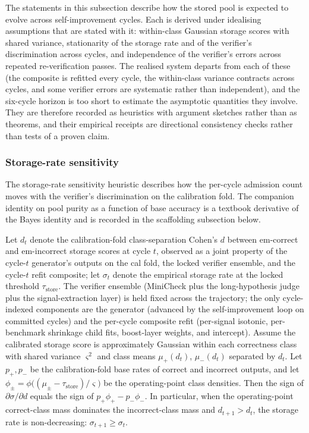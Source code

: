 The statements in this subsection describe how the stored pool is expected to evolve across self-improvement cycles. Each is derived under idealising assumptions that are stated with it: within-class Gaussian storage scores with shared variance, stationarity of the storage rate and of the verifier's discrimination across cycles, and independence of the verifier's errors across repeated re-verification passes. The realised system departs from each of these (the composite is refitted every cycle, the within-class variance contracts across cycles, and some verifier errors are systematic rather than independent), and the six-cycle horizon is too short to estimate the asymptotic quantities they involve. They are therefore recorded as heuristics with argument sketches rather than as theorems, and their empirical receipts are directional consistency checks rather than tests of a proven claim.

\subsubsection{Storage-rate sensitivity}
\label{sec:theorem-monotonicity}

The storage-rate sensitivity heuristic describes how the per-cycle admission count moves with the verifier's discrimination on the calibration fold. The companion identity on pool purity as a function of base accuracy is a textbook derivative of the Bayes identity and is recorded in the scaffolding subsection below.

\begin{heuristic}
\label{thm:monotone}
Let $d_{t}$ denote the calibration-fold class-separation Cohen's $d$ between em-correct and em-incorrect storage scores at cycle $t$, observed as a joint property of the cycle-$t$ generator's outputs on the cal fold, the locked verifier ensemble, and the cycle-$t$ refit composite; let $\sigma_{t}$ denote the empirical storage rate at the locked threshold $\tau_{\text{store}}$. The verifier ensemble (MiniCheck plus the long-hypothesis judge plus the signal-extraction layer) is held fixed across the trajectory; the only cycle-indexed components are the generator (advanced by the self-improvement loop on committed cycles) and the per-cycle composite refit (per-signal isotonic, per-benchmark shrinkage child fits, boost-layer weights, and intercept). Assume the calibrated storage score is approximately Gaussian within each correctness class with shared variance $\varsigma^{2}$ and class means $\mu_{+}(d_{t})$, $\mu_{-}(d_{t})$ separated by $d_{t}$. Let $p_{+}, p_{-}$ be the calibration-fold base rates of correct and incorrect outputs, and let $\phi_{\pm} = \phi\!\big((\mu_{\pm} - \tau_{\text{store}})/\varsigma\big)$ be the operating-point class densities. Then the sign of $\partial \sigma / \partial d$ equals the sign of $p_{+}\phi_{+} - p_{-}\phi_{-}$. In particular, when the operating-point correct-class mass dominates the incorrect-class mass and $d_{t+1} > d_{t}$, the storage rate is non-decreasing: $\sigma_{t+1} \ge \sigma_{t}$.
\end{heuristic}

